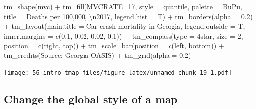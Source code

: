 \documentclass[
]{book}
\newenvironment{Shaded}{\begin{snugshade}}{\end{snugshade}}
\newcommand{\AttributeTok}[1]{\textcolor[rgb]{0.77,0.63,0.00}{#1}}
\newcommand{\DecValTok}[1]{\textcolor[rgb]{0.00,0.00,0.81}{#1}}
\newcommand{\FloatTok}[1]{\textcolor[rgb]{0.00,0.00,0.81}{#1}}
\newcommand{\FunctionTok}[1]{\textcolor[rgb]{0.00,0.00,0.00}{#1}}
\newcommand{\NormalTok}[1]{#1}
\newcommand{\SpecialCharTok}[1]{\textcolor[rgb]{0.00,0.00,0.00}{#1}}
\newcommand{\StringTok}[1]{\textcolor[rgb]{0.31,0.60,0.02}{#1}}
\begin{document}
\begin{Shaded}
\begin{Highlighting}[]
\FunctionTok{tm\_shape}\NormalTok{(mvc) }\SpecialCharTok{+}
  \FunctionTok{tm\_fill}\NormalTok{(}\StringTok{\textquotesingle{}MVCRATE\_17\textquotesingle{}}\NormalTok{,}
          \AttributeTok{style =} \StringTok{\textquotesingle{}quantile\textquotesingle{}}\NormalTok{,}
          \AttributeTok{palette =} \StringTok{\textquotesingle{}BuPu\textquotesingle{}}\NormalTok{,}
          \AttributeTok{title =} \StringTok{\textquotesingle{}Deaths per 100,000, }\SpecialCharTok{\textbackslash{}n}\StringTok{2017\textquotesingle{}}\NormalTok{,}
          \AttributeTok{legend.hist =}\NormalTok{ T) }\SpecialCharTok{+}
  \FunctionTok{tm\_borders}\NormalTok{(}\AttributeTok{alpha =} \FloatTok{0.2}\NormalTok{) }\SpecialCharTok{+}
  \FunctionTok{tm\_layout}\NormalTok{(}\AttributeTok{main.title =} \StringTok{\textquotesingle{}Car crash mortality in Georgia\textquotesingle{}}\NormalTok{,}
            \AttributeTok{legend.outside =}\NormalTok{ T, }
            \AttributeTok{inner.margins =} \FunctionTok{c}\NormalTok{(}\FloatTok{0.1}\NormalTok{, }\FloatTok{0.02}\NormalTok{, }\FloatTok{0.02}\NormalTok{, }\FloatTok{0.1}\NormalTok{)) }\SpecialCharTok{+}
  \FunctionTok{tm\_compass}\NormalTok{(}\AttributeTok{type =} \StringTok{\textquotesingle{}4star\textquotesingle{}}\NormalTok{, }
             \AttributeTok{size =} \DecValTok{2}\NormalTok{,}
             \AttributeTok{position =} \FunctionTok{c}\NormalTok{(}\StringTok{\textquotesingle{}right\textquotesingle{}}\NormalTok{, }\StringTok{\textquotesingle{}top\textquotesingle{}}\NormalTok{)) }\SpecialCharTok{+}
  \FunctionTok{tm\_scale\_bar}\NormalTok{(}\AttributeTok{position =} \FunctionTok{c}\NormalTok{(}\StringTok{\textquotesingle{}left\textquotesingle{}}\NormalTok{, }\StringTok{\textquotesingle{}bottom\textquotesingle{}}\NormalTok{)) }\SpecialCharTok{+}
  \FunctionTok{tm\_credits}\NormalTok{(}\StringTok{\textquotesingle{}Source: Georgia OASIS\textquotesingle{}}\NormalTok{) }\SpecialCharTok{+}
  \FunctionTok{tm\_grid}\NormalTok{(}\AttributeTok{alpha =} \FloatTok{0.2}\NormalTok{)}
\end{Highlighting}
\end{Shaded}

\texttt{[image: 56-intro-tmap\_files/figure-latex/unnamed-chunk-19-1.pdf]}

\hypertarget{change-the-global-style-of-a-map}{%
\subsection{Change the global style of a map}\label{change-the-global-style-of-a-map}}
\end{document}
